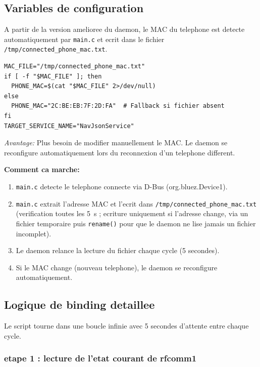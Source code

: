 \documentclass[a4paper,11pt]{article}
\begin{document}
\subsection{Variables de configuration}

A partir de la version amelioree du daemon, le MAC du telephone est detecte automatiquement
par \texttt{main.c} et ecrit dans le fichier \texttt{/tmp/connected\_phone\_mac.txt}.

\begin{lstlisting}[style=bashcode,caption={nav-bind-daemon.sh --- detection auto du MAC}]
MAC_FILE="/tmp/connected_phone_mac.txt"
if [ -f "$MAC_FILE" ]; then
  PHONE_MAC=$(cat "$MAC_FILE" 2>/dev/null)
else
  PHONE_MAC="2C:BE:EB:7F:2D:FA"  # Fallback si fichier absent
fi
TARGET_SERVICE_NAME="NavJsonService"
\end{lstlisting}

\emph{Avantage:} Plus besoin de modifier manuellement le MAC. Le daemon se reconfigure
automatiquement lors du reconnexion d'un telephone different.

\textbf{Comment ca marche:}
\begin{enumerate}
  \item \texttt{main.c} detecte le telephone connecte via D-Bus (org.bluez.Device1).
  \item \texttt{main.c} extrait l'adresse MAC et l'ecrit dans \texttt{/tmp/connected\_phone\_mac.txt}
    (verification toutes les 5~s ; ecriture uniquement si l'adresse change, via un fichier
    temporaire puis \texttt{rename()} pour que le daemon ne lise jamais un fichier incomplet).
  \item Le daemon relance la lecture du fichier chaque cycle (5 secondes).
  \item Si le MAC change (nouveau telephone), le daemon se reconfigure automatiquement.
\end{enumerate}

\subsection{Logique de binding detaillee}

Le script tourne dans une boucle infinie avec 5 secondes d'attente entre chaque cycle.

\subsubsection{etape 1 : lecture de l'etat courant de rfcomm1}
\end{document}
